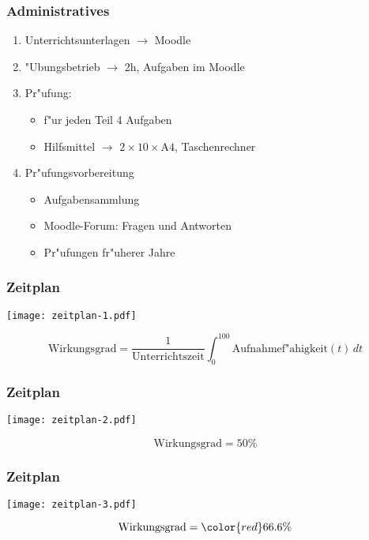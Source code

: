 \begin{frame}
\frametitle{Administratives}
\begin{enumerate}
\item Unterrichtsunterlagen $\to$ Moodle
\item "Ubungsbetrieb $\to$ 2h, Aufgaben im Moodle
\item Pr"ufung:
\begin{itemize}
\item f"ur jeden Teil 4 Aufgaben
\item Hilfsmittel $\to$ $2\times 10\times \text{A4}$, Taschenrechner
\end{itemize}
\item Pr"ufungsvorbereitung
\begin{itemize}
\item Aufgabensammlung
\item Moodle-Forum: Fragen und Antworten
\item Pr"ufungen fr"uherer Jahre
\end{itemize}
\end{enumerate}
\end{frame}

\begin{frame}
\frametitle{Zeitplan}
\begin{center}
\texttt{[image: zeitplan-1.pdf]}
\end{center}
\[
\text{Wirkungsgrad}
=
\frac{1}{\text{Unterrichtszeit}}
\int_0^{100}\text{Aufnahmef"ahigkeit}(t)\,dt
\]
\end{frame}

\begin{frame}
\frametitle{Zeitplan}
\begin{center}
\texttt{[image: zeitplan-2.pdf]}
\end{center}
\[
\text{Wirkungsgrad}= 50\%
\]
\end{frame}

\begin{frame}
\frametitle{Zeitplan}
\begin{center}
\texttt{[image: zeitplan-3.pdf]}
\end{center}
\[
\text{Wirkungsgrad}= \color{red}66.6\%
\]
\end{frame}

